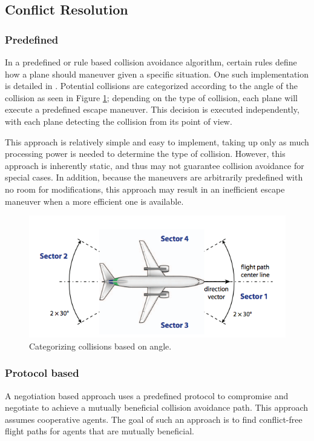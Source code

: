 \documentclass[conference]{IEEEtran}
\begin{document}
\subsection{Conflict Resolution}


\subsubsection{Predefined}
In a predefined or rule based collision avoidance algorithm, certain rules define how a plane should maneuver given a specific situation.
One such implementation is detailed in \cite{sislak2006negotiation}. Potential collisions are categorized according to the angle of the collision as seen in Figure \ref{fig:06SislakID}; depending on the type of collision, each plane will execute a predefined escape maneuver. This decision is executed independently, with each plane detecting the collision from its point of view.  

This approach is relatively simple and easy to implement, taking up only as much processing power is needed to determine the type of collision. However, this approach is inherently static, and thus may not guarantee collision avoidance for special cases. In addition, because the maneuvers are arbitrarily predefined with no room for modifications, this approach may result in an inefficient escape maneuver when a more efficient one is available. 
\begin{figure}[h]
	\includegraphics [width=1\columnwidth] {06SislakCollisionID}
	\caption{Categorizing collisions based on angle. \cite{sislak2006negotiation}}
	\label{fig:06SislakID}
\end{figure}
\subsubsection{Protocol based}

A negotiation based approach uses a predefined protocol to compromise and negotiate to achieve a mutually beneficial collision avoidance path. This approach assumes cooperative agents. The goal of such an approach is to find conflict-free flight paths for agents that are mutually beneficial.
\end{document}
